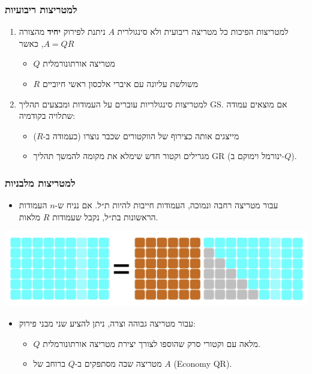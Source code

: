 \documentclass[11pt]{article}
\begin{document}
\subsubsection{למטריצות ריבועיות}
\label{sec:org281cf63}
\begin{enumerate}
\item למטריצות הפיכות
\label{sec:org04791bb}
כל מטריצה ריבועית ולא סינגולרית \(A\) ניתנת לפירוק \textbf{יחיד} מהצורה \(A=QR\), כאשר
\begin{itemize}
\item \(Q\) מטריצה אורתונורמלית
\item \(R\) משולשת עליונה עם איברי אלכסון ראשי חיוביים
\end{itemize}

\item למטריצות סינגולריות
\label{sec:org431f867}
עוברים על העמודות ומבצעים תהליך GS. אם מוצאים עמודה שתלויה בקודמיה:
\begin{itemize}
\item מייצגים אותה כצירוף של הווקטורים שכבר נוצרו (כעמודה ב-\(R\))
\item מגרילים וקטור חדש שימלא את מקומה להמשך תהליך GR (ינורמל וימוקם ב-\(Q\)).
\end{itemize}
\end{enumerate}

\subsubsection{למטריצות מלבניות}
\label{sec:org56354b2}
\begin{itemize}
\item עבור מטריצה רחבה ונמוכה, העמודות חייבות להיות ת״ל.
אם נניח ש-\(n\) העמודות הראשונות בת״ל, נקבל שעמודות \(R\) מלאות.
\end{itemize}

\begin{center}
\includegraphics[width=.9\linewidth]{./img/QR-wide-short.png}
\end{center}

\begin{itemize}
\item עבור מטריצה גבוהה וצרה, ניתן להציע שני מבני פירוק:
\begin{itemize}
\item \(Q\) מלאה עם וקטורי סרק שהוספו לצורך יצירת מטריצה אורתונורמלית.
\item מטריצה שבה מסתפקים ב-\(Q\) ברוחב של \(A\) (Economy QR).
\end{itemize}
\end{itemize}
\end{document}
